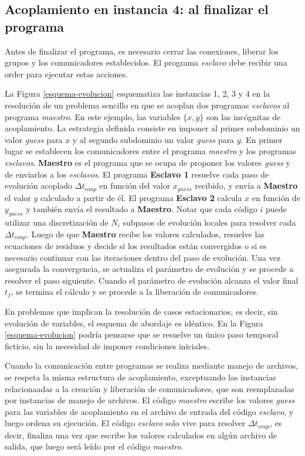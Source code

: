 \subsection*{Acoplamiento en instancia 4: al finalizar el programa}

Antes de finalizar el programa, es necesario cerrar las conexiones, liberar los grupos y los comunicadores establecidos.
El programa \textit{esclavo} debe recibir una order para ejecutar estas acciones.

\bigskip

La Figura \ref{esquema-evolucion} esquematiza las instancias 1, 2, 3 y 4 en la resolución de un problema sencillo
en que se acoplan dos programas \textit{esclavos} al programa \textit{maestro}.
En este ejemplo, las variables $\{x,y\}$ son las incógnitas de acoplamiento.
La estrategia definida consiste en imponer al primer subdominio un valor \textit{guess} para $x$ y al segundo subdominio un valor \textit{guess} para $y$.
En primer lugar se establecen los comunicadores entre el programa \textit{maestro} y los programas \textit{esclavos}.
\textbf{Maestro} es el programa que se ocupa de proponer los valores \textit{guess} y de enviarlos a los \textit{esclavos}.
El programa \textbf{Esclavo 1} resuelve cada paso de evolución acoplado $\Delta t_{coup}$ en función del valor $x_{guess}$ recibido, y envía a \textbf{Maestro} el valor $y$ calculado a partir de él.
El programa \textbf{Esclavo 2} calcula $x$ en función de $y_{guess}$ y también envía el resultado a \textbf{Maestro}.
Notar que cada código $i$ puede utilizar una discretización de $N_i$ subpasos de evolución locales para resolver cada $\Delta t_{coup}$.
Luego de que \textbf{Maestro} recibe los valores calculados, 
resuelve las ecuaciones de residuos y decide si los resultados están convergidos o si es necesario continuar con las iteraciones dentro del paso de evolución.
Una vez asegurada la convergencia, se actualiza el parámetro de evolución y se procede a resolver el paso siguiente.
Cuando el parámetro de evolución alcanza el valor final $t_f$, se termina el cálculo y se procede a la liberación de comunicadores.

En problemas que implican la resolución de casos estacionarios, es decir, sin evolución de variables, el esquema de abordaje es idéntico.
En la Figura \ref{esquema-evolucion} podría pensarse que se resuelve un único paso temporal ficticio, sin la necesidad de imponer condiciones iniciales.

Cuando la comunicación entre programas se realiza mediante manejo de archivos, se respeta la misma estructura de acoplamiento,
exceptuando las instancias relacionaadas a la creación y liberación de comunicadores, que son reemplazadas por instancias de manejo de archivos.
El código \textit{maestro} escribe los valores \textit{guess} para las variables de acoplamiento en el archivo de entrada del código \textit{esclavo}, y luego ordena su ejecución.
El código \textit{esclavo} solo vive para resolver $\Delta t_{coup}$, es decir, finaliza una vez que escribe los valores calculados en algún archivo de salida,
que luego será leído por el código \textit{maestro}.

